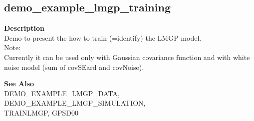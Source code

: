 \subsection*{demo\_example\_lmgp\_training} \label{fun:demo_example_lmgp_training}

\textbf{Description}
\\ Demo to present the how to train (=identify) the LMGP model.
\\ Note:
\\ Currently it can be used only with Gaussian covariance function and
 with white noise model (sum of covSEard and covNoise).

\textbf{See Also}
\\ DEMO\_EXAMPLE\_LMGP\_DATA, DEMO\_EXAMPLE\_LMGP\_SIMULATION,
\\ TRAINLMGP, GPSD00
